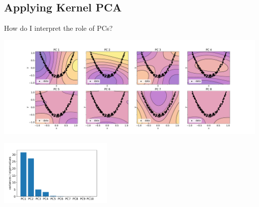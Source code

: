 

\subsection{Applying Kernel PCA}

\begin{frame}{How do I interpret the role of PCs?}


\svspace{-7mm}

\begin{center}
	\includegraphics[height=5cm]{img/contourplot_kpca_rbf}
\end{center}
\svspace{-0.8cm}
\begin{center}
	\includegraphics[height=3.2cm]{img/screeplot_kpca_rbf.pdf}
\end{center}

\end{frame}

